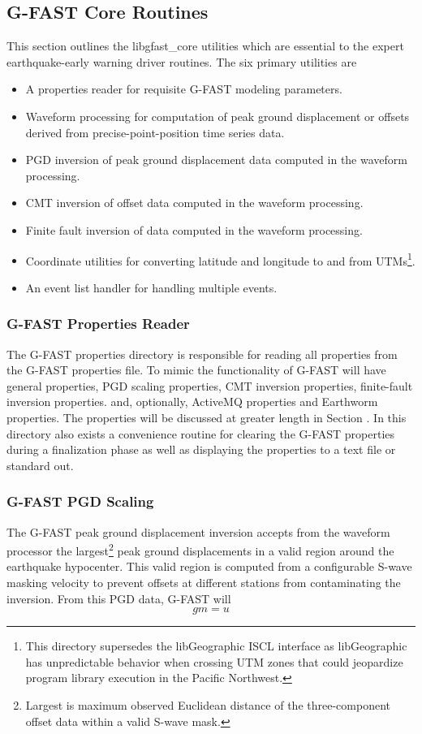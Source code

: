 \documentclass[12pt]{article}
\begin{document}
\subsection{G-FAST Core Routines}\label{ss:gfastCore}
This section outlines the libgfast\_core utilities which are essential to the expert
earthquake-early warning driver routines.  The six primary utilities are
\begin{itemize}
  \item A properties reader for requisite G-FAST modeling parameters.
  \item Waveform processing for computation of peak ground displacement or offsets
  derived from precise-point-position time series data.
  \item PGD inversion of peak ground displacement data computed in the waveform processing.
  \item CMT inversion of offset data computed in the waveform processing.
  \item Finite fault inversion of data computed in the waveform processing.
  \item Coordinate utilities for converting latitude and longitude to and from 
  UTMs\footnote{This directory supersedes the libGeographic ISCL interface as libGeographic 
            has unpredictable behavior when crossing UTM zones that could jeopardize
            program library execution in the Pacific Northwest.}.   
  \item An event list handler for handling multiple events.
\end{itemize}

\subsubsection{G-FAST Properties Reader}
The G-FAST properties directory is responsible for reading all properties from the 
G-FAST properties file.  To mimic the functionality of G-FAST will have general
properties, PGD scaling properties, CMT inversion properties, finite-fault inversion properties.
and, optionally, ActiveMQ properties and Earthworm properties.  
The properties will be discussed at greater length in
Section \label{S:propertiesFile}.  In this directory also exists a convenience routine for
clearing the G-FAST properties during a finalization phase as well as displaying the properties
to a text file or standard out.

\subsubsection{G-FAST PGD Scaling}
The G-FAST peak ground displacement inversion accepts from the waveform processor the
largest\footnote{Largest is maximum observed Euclidean distance of the three-component offset 
data within a valid S-wave mask.} peak ground displacements in a valid region around the
earthquake hypocenter.  This valid region is computed from a configurable S-wave masking velocity to
prevent offsets at different stations from contaminating the inversion.  From this PGD data, 
G-FAST will 
\begin{equation}
 gm=u
\end{equation}
\end{document}
